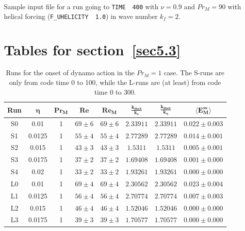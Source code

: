 \documentclass[12pt,a4paper]{report}
\begin{document}
Sample input file for a run going to \texttt{TIME~~400} with $\nu=0.9$ and $Pr_M=90$ with helical forcing (\texttt{F\_UHELICITY~~1.0}) in wave number $k_f=2$.



\chapter{Tables for section~\ref{sec5.3}}

\begin{table}[ht]
\begin{center}
\begin{tabular}{||c|c|c|c|c|c|c|c||}
\hline
\textbf{Run} & $ \bm{\eta} $ & $ \bm{ Pr_M} $ & $ \bm{ Re} $ & $ \bm{ Re_M} $ & $ \bm{ \frac{k_{max}}{k_\nu}} $ & $ \bm{ \frac{k_{max}}{k_\eta}} $ & $ \bm{ \langle E_M^{ss}} \rangle $ \\ \hline
S0 & 0.01 & 1 & $ 69 \pm 6 $ & $ 69 \pm 6 $ & $ 2.33911 $ & $ 2.33911 $ & $ 0.022 \pm 0.003 $ \\ \hline
S1 & 0.0125 & 1 & $ 55 \pm 4 $ & $ 55 \pm 4 $ & $ 2.77289 $ & $ 2.77289 $ & $ 0.014 \pm 0.001 $ \\ \hline
S2 & 0.015 & 1 & $ 43 \pm 3 $ & $ 43 \pm 3 $ & $ 1.5311 $ & $ 1.5311 $ & $ 0.005 \pm 0.001 $ \\ \hline
S3 & 0.0175 & 1 & $ 37 \pm 2 $ & $ 37 \pm 2 $ & $ 1.69408 $ & $ 1.69408 $ & $ 0.001 \pm 0.000 $ \\ \hline
S4 & 0.02 & 1 & $ 33 \pm 2 $ & $ 33 \pm 2 $ & $ 1.93261 $ & $ 1.93261 $ & $ 0.000 \pm 0.000 $ \\ \hline \hline
L0 & 0.01 & 1 & $ 69 \pm 4 $ & $ 69 \pm 4 $ & $ 2.30562 $ & $ 2.30562 $ & $ 0.023 \pm 0.004 $ \\ \hline
L1 & 0.0125 & 1 & $ 56 \pm 4 $ & $ 56 \pm 4 $ & $ 2.70774 $ & $ 2.70774 $ & $ 0.007 \pm 0.003 $ \\ \hline
L2 & 0.015 & 1 & $ 46 \pm 4 $ & $ 46 \pm 4 $ & $ 1.52046 $ & $ 1.52046 $ & $ 0.000 \pm 0.000 $ \\ \hline
L3 & 0.0175 & 1 & $ 39 \pm 3 $ & $ 39 \pm 3 $ & $ 1.70577 $ & $ 1.70577 $ & $ 0.000 \pm 0.000 $ \\ \hline
\end{tabular}
\end{center}
\caption{Runs for the onset of dynamo action in the $Pr_M=1$ case. The S-runs are only from code time 0 to 100, while the L-runs are (at least) from code time 0 to 300.}
\label{tableB1}
\end{table}
\end{document}
